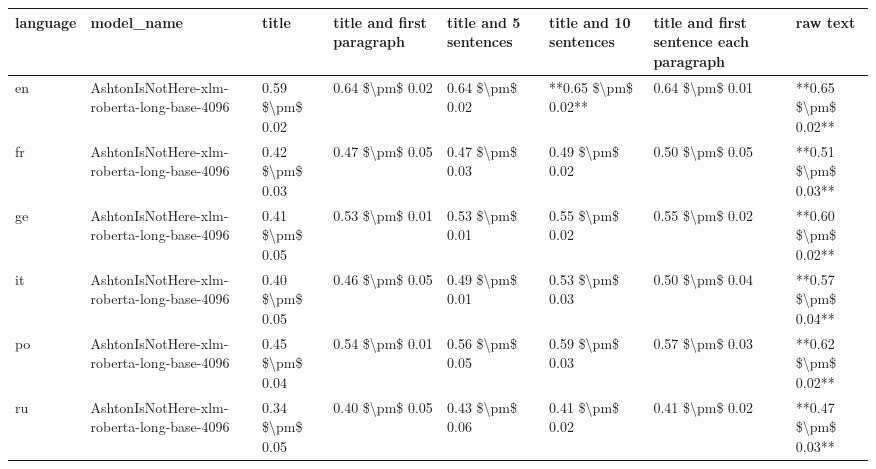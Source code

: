 \begin{tabular}{llllllll}
\toprule
language &                                 model\_name &           title & title and first paragraph & title and 5 sentences & title and 10 sentences & title and first sentence each paragraph &            raw text \\
\midrule
      en & AshtonIsNotHere-xlm-roberta-long-base-4096 & 0.59 \$\textbackslash pm\$ 0.02 &           0.64 \$\textbackslash pm\$ 0.02 &       0.64 \$\textbackslash pm\$ 0.02 &    **0.65 \$\textbackslash pm\$ 0.02** &                         0.64 \$\textbackslash pm\$ 0.01 & **0.65 \$\textbackslash pm\$ 0.02** \\
      fr & AshtonIsNotHere-xlm-roberta-long-base-4096 & 0.42 \$\textbackslash pm\$ 0.03 &           0.47 \$\textbackslash pm\$ 0.05 &       0.47 \$\textbackslash pm\$ 0.03 &        0.49 \$\textbackslash pm\$ 0.02 &                         0.50 \$\textbackslash pm\$ 0.05 & **0.51 \$\textbackslash pm\$ 0.03** \\
      ge & AshtonIsNotHere-xlm-roberta-long-base-4096 & 0.41 \$\textbackslash pm\$ 0.05 &           0.53 \$\textbackslash pm\$ 0.01 &       0.53 \$\textbackslash pm\$ 0.01 &        0.55 \$\textbackslash pm\$ 0.02 &                         0.55 \$\textbackslash pm\$ 0.02 & **0.60 \$\textbackslash pm\$ 0.02** \\
      it & AshtonIsNotHere-xlm-roberta-long-base-4096 & 0.40 \$\textbackslash pm\$ 0.05 &           0.46 \$\textbackslash pm\$ 0.05 &       0.49 \$\textbackslash pm\$ 0.01 &        0.53 \$\textbackslash pm\$ 0.03 &                         0.50 \$\textbackslash pm\$ 0.04 & **0.57 \$\textbackslash pm\$ 0.04** \\
      po & AshtonIsNotHere-xlm-roberta-long-base-4096 & 0.45 \$\textbackslash pm\$ 0.04 &           0.54 \$\textbackslash pm\$ 0.01 &       0.56 \$\textbackslash pm\$ 0.05 &        0.59 \$\textbackslash pm\$ 0.03 &                         0.57 \$\textbackslash pm\$ 0.03 & **0.62 \$\textbackslash pm\$ 0.02** \\
      ru & AshtonIsNotHere-xlm-roberta-long-base-4096 & 0.34 \$\textbackslash pm\$ 0.05 &           0.40 \$\textbackslash pm\$ 0.05 &       0.43 \$\textbackslash pm\$ 0.06 &        0.41 \$\textbackslash pm\$ 0.02 &                         0.41 \$\textbackslash pm\$ 0.02 & **0.47 \$\textbackslash pm\$ 0.03** \\
\bottomrule
\end{tabular}
